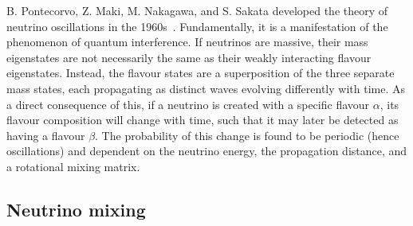 B. Pontecorvo, Z. Maki, M. Nakagawa, and S. Sakata developed the theory of neutrino oscillations
in the 1960s~\cite{maki1962, pontecorvo1967, pontecorvo1969}. Fundamentally, it is a manifestation
of the phenomenon of quantum interference. If neutrinos are massive, their mass eigenstates are
not necessarily the same as their weakly interacting flavour eigenstates. Instead, the flavour
states are a superposition of the three separate mass states, each propagating as distinct waves
evolving differently with time. As a direct consequence of this, if a neutrino is created with a
specific flavour $\alpha$, its flavour composition will change with time, such that it may later
be detected as having a flavour $\beta$. The probability of this change is found to be periodic
(hence oscillations) and dependent on the neutrino energy, the propagation distance, and a
rotational mixing matrix.

\subsection{Neutrino mixing} %
\label{sec:theory_oscillations_mixing} %

